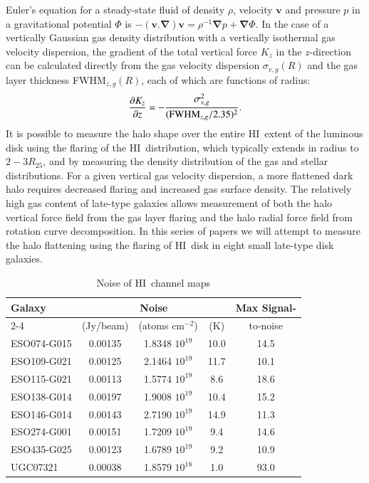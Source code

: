 \documentclass[traditabstract]{aa} %
\newcommand\HI{H{\small I}}
\begin{document}
Euler's equation for a steady-state fluid of density $\rho$, velocity
$\mathbf{v}$ and pressure $p$ in a gravitational potential $\Phi$ 
is $-\mathbf{(v.\nabla)v} = \rho^{-1}
\mathbf{\nabla}p + \mathbf{\nabla}\Phi$.  
In the case of a vertically Gaussian gas
density distribution with a vertically isothermal gas velocity
dispersion, the gradient of the total vertical force $K_z$ in the
$z$-direction can be calculated directly from the gas velocity
dispersion $\sigma_{v,g}(R)$ and the gas layer thickness FWHM$_{z,g}(R)$,
each of which are functions of radius:
\begin{equation}
\label{eq:ch1-hydro}
\frac{\partial K_z}{\partial z} = -
\frac{\sigma_{v,g}^2}{({\rm FWHM}_{z,g}/2.35)^2}.
\end{equation}
It is possible to measure the
halo shape over the entire \HI\ extent of the luminous disk using the 
flaring of the \HI\ distribution, which typically extends
in radius to $2-3 R_{25}$, and by measuring the density distribution
of the gas and stellar distributions.  For
a given vertical gas velocity dispersion, a more flattened
dark halo requires decreased flaring
and increased gas surface density. The relatively high gas content of 
late-type galaxies allows measurement of both the halo vertical force 
field from the gas layer 
flaring and the halo radial force field from rotation curve decomposition.
In this series of papers we will attempt to measure the halo flattening
using the flaring of \HI\ disk in eight small late-type disk galaxies.

\begin{table}[t] %
\caption[Noise of \HI\ channel maps]{Noise of \HI\ channel maps}
\label{tab:noise-HI}
\begin{tabular}{lcccc}
\hline
Galaxy & \multicolumn{3}{c}{Noise} & Max Signal-\\
\cline{2-4}
& (Jy/beam) & (atoms cm$^{-2}$) & (K) & to-noise \\
\hline\hline
ESO074-G015 &  0.00135 &    1.8348 $10^{19}$ &   10.0 & 14.5 \\
ESO109-G021 &  0.00125 &    2.1464 $10^{19}$ &   11.7 & 10.1 \\
ESO115-G021 &  0.00113 &    1.5774 $10^{19}$ &    8.6 & 18.6 \\
ESO138-G014 &  0.00197 &    1.9008 $10^{19}$ &   10.4 & 15.2 \\
ESO146-G014 &  0.00143 &    2.7190 $10^{19}$ &   14.9 & 11.3 \\
ESO274-G001 &  0.00151 &    1.7209 $10^{19}$ &    9.4 & 14.6 \\
ESO435-G025 &  0.00123 &    1.6789 $10^{19}$ &    9.2 & 10.9 \\
UGC07321    &  0.00038 &    1.8579 $10^{18}$ &    1.0 & 93.0 \\
\hline
\end{tabular}
\end{table}
\end{document}
